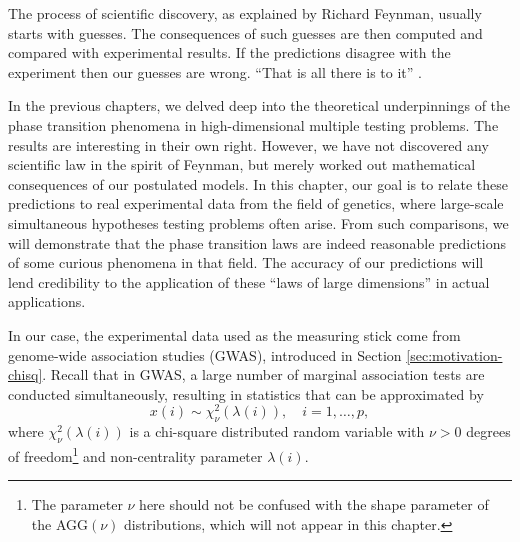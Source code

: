 
The process of scientific discovery, as explained by Richard Feynman, usually starts with guesses.
The consequences of such guesses are then computed and compared with experimental results.
If the predictions disagree with the experiment then our guesses are wrong. ``That is all there is to it''  \citep{feynman2017character}.

In the previous chapters, we delved deep into the theoretical underpinnings of the phase transition phenomena in high-dimensional multiple testing problems.
The results are interesting in their own right.
However, we have not discovered any scientific law in the spirit of Feynman, but merely worked out mathematical consequences of our postulated models.
In this chapter, our goal is to relate these predictions to real experimental data from the field of genetics, where large-scale simultaneous hypotheses testing problems often arise.
From such comparisons, we will demonstrate that the phase transition laws are indeed reasonable predictions of some curious phenomena in that field.
The accuracy of our predictions will lend credibility to the application of these ``laws of large dimensions'' in actual applications.

\medskip

In our case, the experimental data used as the measuring stick come from genome-wide association studies (\ac{GWAS}), introduced in Section \ref{sec:motivation-chisq}.
Recall that in \ac{GWAS}, a large number of marginal association tests are conducted simultaneously, resulting in statistics that can be approximated by
\begin{equation} \label{eq:model-chisq-Chapter6}
    x(i) \sim \chi_\nu^2\left(\lambda(i)\right), \quad i=1,\ldots,p,
\end{equation}
where $\chi_\nu^2\left(\lambda(i)\right)$ is a chi-square distributed random variable with $\nu>0$ degrees of 
freedom\footnote{The parameter $\nu$ here should not be confused with the shape parameter of the AGG$(\nu)$ 
distributions, which will not appear in this chapter.} and non-centrality parameter $\lambda(i)$.


